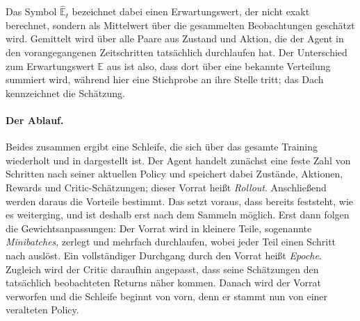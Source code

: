Das Symbol $\hat{\mathbb{E}}_t$ bezeichnet dabei einen Erwartungswert, der nicht
exakt berechnet, sondern als Mittelwert über die gesammelten Beobachtungen
geschätzt wird. Gemittelt wird über alle Paare aus Zustand und Aktion, die der
Agent in den vorangegangenen Zeitschritten tatsächlich durchlaufen hat. Der
Unterschied zum Erwartungswert $\mathbb{E}$ aus  ist also, dass
dort über eine bekannte Verteilung summiert wird, während hier eine Stichprobe
an ihre Stelle tritt; das Dach kennzeichnet die Schätzung.

\paragraph{Der Ablauf.}
Beides zusammen ergibt eine Schleife, die sich über das gesamte Training
wiederholt und in  dargestellt ist. Der Agent handelt
zunächst eine feste Zahl von Schritten nach seiner aktuellen Policy und
speichert dabei Zustände, Aktionen, Rewards und Critic-Schätzungen; dieser
Vorrat heißt \emph{Rollout}. Anschließend werden daraus die Vorteile bestimmt.
Das setzt voraus, dass bereits feststeht, wie es weiterging, und ist deshalb
erst nach dem Sammeln möglich. Erst dann folgen die Gewichtsanpassungen: Der Vorrat wird in
kleinere Teile, sogenannte \emph{Minibatches}, zerlegt und mehrfach
durchlaufen, wobei jeder Teil einen Schritt nach 
auslöst. Ein vollständiger Durchgang durch den Vorrat heißt \emph{Epoche}.
Zugleich wird der Critic daraufhin angepasst, dass seine Schätzungen den
tatsächlich beobachteten Returns näher kommen. Danach wird der Vorrat verworfen
und die Schleife beginnt von vorn, denn er stammt nun von einer veralteten
Policy.


